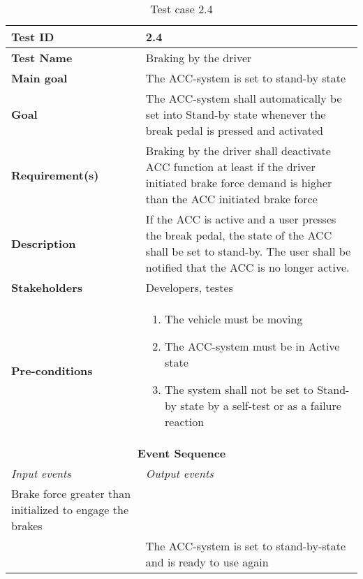 \begin{table}[H]
\centering
\begin{tabularx}{\linewidth}{X|X}
    \hline
    \textbf{Test ID} & 2.4 \\
    \hline
    \textbf{Test Name} & Braking by the driver \\
    \hline
    \textbf{Main goal} & The ACC-system is set to stand-by state  \\
    \hline
    \textbf{Goal} & The ACC-system shall automatically be set into Stand-by state whenever the break pedal is pressed and activated \\
    \hline
    \textbf{Requirement(s)} & Braking by the driver shall deactivate ACC function at least if the driver initiated brake force demand is higher than the ACC initiated brake force \\
    \hline
    \textbf{Description} & If the ACC is active and a user presses the break pedal, the state of the ACC shall be set to stand-by. The user shall be notified that the ACC is no longer active.\\
    \hline
    \textbf{Stakeholders} & Developers, testes \\
    \hline
    \textbf{Pre-conditions} & 
    \begin{enumerate}
        \item The vehicle must be moving
        \item The ACC-system must be in Active state
        \item The system shall not be set to Stand-by state by a self-test or as a failure reaction
    \end{enumerate}\\
    \hline
    \multicolumn{2}{c}{\textbf{Event Sequence}} \\
    \hline
    \textit{Input events} & \textit{Output events} \\
    \hline
    Brake force greater than initialized to engage the brakes &  \\
    \hline
     & The ACC-system is set to stand-by-state and is ready to use again \\
    \hline
\end{tabularx}
\caption{\label{tab_case2_4} Test case 2.4}
\end{table}

